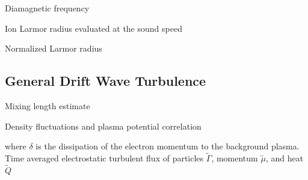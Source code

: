 \noindent Diamagnetic frequency 

\noindent Ion Larmor radius evaluated at the sound speed \cite{tynan}

\noindent Normalized Larmor radius 
\index{$\rho_{*}$}

\subsection{General Drift Wave Turbulence}

Mixing length estimate \cite{tynan}

\noindent Density fluctuations and plasma potential correlation \cite{tynan}

\hangindent=0.25in where $\delta$ is the dissipation of the electron momentum to the background plasma.\\

\noindent Time averaged electrostatic turbulent flux of particles $\tilde{\Gamma}$, momentum $\overleftrightarrow{\mu}$, and heat $\tilde{Q}$ \cite{tynan}





